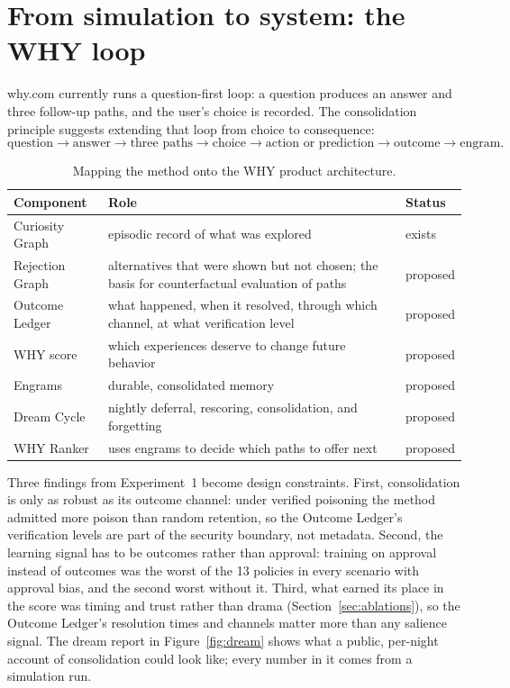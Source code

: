 \documentclass[11pt]{article}
\begin{document}
\section{From simulation to system: the WHY loop}
\label{sec:system}

why.com currently runs a question-first loop: a question produces an answer and three follow-up paths, and the user's choice is recorded. The consolidation principle suggests extending that loop from choice to consequence:
\[
\text{question}\rightarrow\text{answer}\rightarrow\text{three paths}\rightarrow\text{choice}\rightarrow\text{action or prediction}\rightarrow\text{outcome}\rightarrow\text{engram}.
\]

\begin{table}[h]
\centering\small
\caption{Mapping the method onto the WHY product architecture.}
\label{tab:system}
\begin{tabular}{@{}lp{9.3cm}l@{}}
\toprule
Component & Role & Status\\
\midrule
Curiosity Graph & episodic record of what was explored & exists\\
Rejection Graph & alternatives that were shown but not chosen; the basis for counterfactual evaluation of paths & proposed\\
Outcome Ledger & what happened, when it resolved, through which channel, at what verification level & proposed\\
WHY score & which experiences deserve to change future behavior & proposed\\
Engrams & durable, consolidated memory & proposed\\
Dream Cycle & nightly deferral, rescoring, consolidation, and forgetting & proposed\\
WHY Ranker & uses engrams to decide which paths to offer next & proposed\\
\bottomrule
\end{tabular}
\end{table}

Three findings from Experiment~1 become design constraints. First, consolidation is only as robust as its outcome channel: under verified poisoning the method admitted more poison than random retention, so the Outcome Ledger's verification levels are part of the security boundary, not metadata. Second, the learning signal has to be outcomes rather than approval: training on approval instead of outcomes was the worst of the 13 policies in every scenario with approval bias, and the second worst without it. Third, what earned its place in the score was timing and trust rather than drama (Section~\ref{sec:ablations}), so the Outcome Ledger's resolution times and channels matter more than any salience signal. The dream report in Figure~\ref{fig:dream} shows what a public, per-night account of consolidation could look like; every number in it comes from a simulation run.
\end{document}

